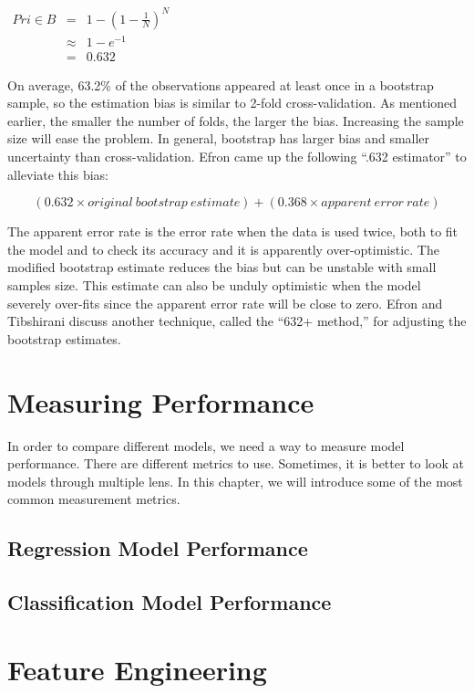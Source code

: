 \documentclass[12pt,]{krantz}
\theoremstyle{definition}
\theoremstyle{definition}
\theoremstyle{definition}
\theoremstyle{remark}
\begin{document}
\(\begin{array}{ccc} Pr{i\in B} & = & 1-\left(1-\frac{1}{N}\right)^{N}\\  & \approx & 1-e^{-1}\\  & = & 0.632 \end{array}\)

On average, 63.2\% of the observations appeared at least once in a
bootstrap sample, so the estimation bias is similar to 2-fold
cross-validation. As mentioned earlier, the smaller the number of folds,
the larger the bias. Increasing the sample size will ease the problem.
In general, bootstrap has larger bias and smaller uncertainty than
cross-validation. Efron came up the following ``.632 estimator'' to
alleviate this bias:

\[(0.632 × original\ bootstrap\ estimate) + (0.368 × apparent\ error\ rate)\]

The apparent error rate is the error rate when the data is used twice,
both to fit the model and to check its accuracy and it is apparently
over-optimistic. The modified bootstrap estimate reduces the bias but
can be unstable with small samples size. This estimate can also be
unduly optimistic when the model severely over-fits since the apparent
error rate will be close to zero. Efron and Tibshirani \citep{b632plus}
discuss another technique, called the ``632+ method,'' for adjusting the
bootstrap estimates.

\chapter{Measuring Performance}\label{measuring-performance}

In order to compare different models, we need a way to measure model
performance. There are different metrics to use. Sometimes, it is better
to look at models through multiple lens. In this chapter, we will
introduce some of the most common measurement metrics.

\section{Regression Model
Performance}\label{regression-model-performance}

\section{Classification Model
Performance}\label{classification-model-performance}

\chapter{Feature Engineering}\label{feature-engineering}
\end{document}
